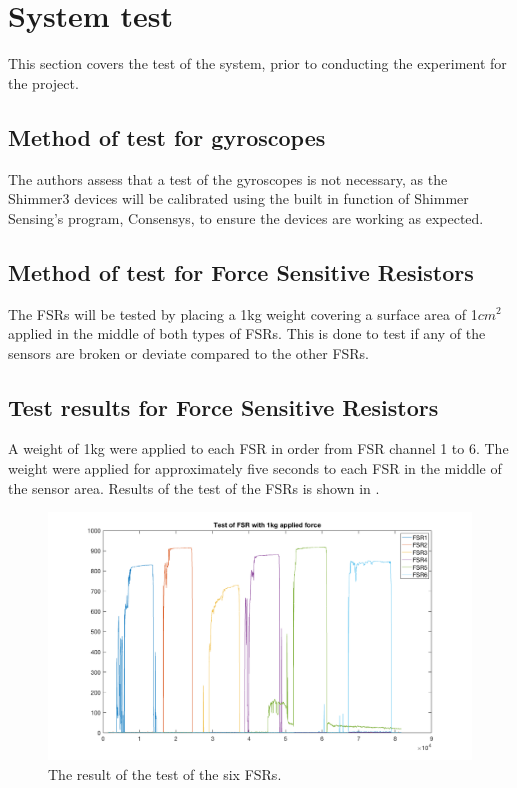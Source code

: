 \section{System test}
This section covers the test of the system, prior to conducting the experiment for the project. 

\subsection{Method of test for gyroscopes}
The authors assess that a test of the gyroscopes is not necessary, as the Shimmer3 devices will be calibrated using the built in function of Shimmer Sensing’s program, Consensys, to ensure the devices are working as expected.



\subsection{Method of test for Force Sensitive Resistors}
The FSRs will be tested by placing a 1kg weight covering a surface area of 1$cm^{2}$ applied in the middle of both types of FSRs. This is done to test if any of the sensors are broken or deviate compared to the other FSRs. %


\subsection{Test  results for Force Sensitive Resistors}
A weight of 1kg were applied to each FSR in order from FSR channel 1 to 6. The weight were applied for approximately five seconds to each FSR in the middle of the sensor area. Results of the test of the FSRs is shown in .

\begin{figure}[H]
	\includegraphics[width=.6\textwidth]{figures/FSRTestPlot1kg}
	\caption{The result of the test of the six FSRs.}
	\label{fig:FSRTestPlot1kg}  %
\end{figure}

